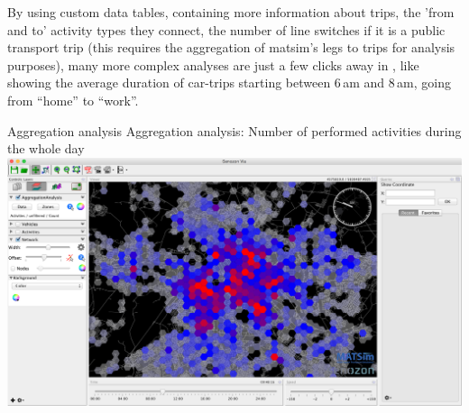 By using custom data tables, \eg containing more information about trips, \ie
the 'from and to' activity types they connect, the number of line switches if
it is a public transport trip (this requires the aggregation of \gls{matsim}'s legs
to trips for analysis purposes), many more complex analyses are just a few
clicks away in \Via{}, like showing the average duration of car-trips starting
between 6\,am and 8\,am, going from ``home'' to ``work''.

\createfigure%
{Aggregation analysis}%
{Aggregation analysis: Number of performed activities during the whole day}%
{\label{fig:via:aggregation}}%
{\includegraphics[width=1.\textwidth,angle=0]{./extending/figures/via/aggregation}}%
{}


